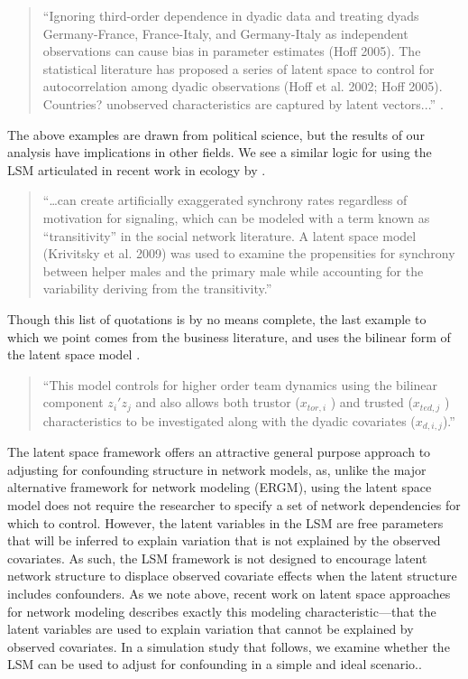 \documentclass[11pt]{article}
\begin{document}
\begin{quote}
``Ignoring third-order dependence in dyadic data and treating dyads
  Germany-France, France-Italy, and Germany-Italy as independent
  observations can cause bias in parameter estimates (Hoff 2005). The
  statistical literature has proposed a series of latent space to
  control for autocorrelation among dyadic observations (Hoff et
  al. 2002; Hoff 2005). Countries? unobserved characteristics are
  captured by latent vectors...'' \citep[p. 17]{cao2016transnational}.
\end{quote}

The above examples are drawn from political science, but the results
of our analysis have implications in other fields. We see a similar
logic for using the LSM articulated in recent work in ecology by
\citet[p. 989]{nomano2015unrelated}.

\begin{quote}
``\ldots can create artificially exaggerated synchrony rates
  regardless of motivation for signaling, which can be modeled with a
  term known as ``transitivity'' in the social network literature. A
  latent space model (Krivitsky et al. 2009) was used to examine the
  propensities for synchrony between helper males and the primary male
  while accounting for the variability deriving from the
  transitivity.''
\end{quote}

Though this list of quotations is by no means complete, the last
example to which we point comes from the business literature, and uses
the bilinear form of the latent space model
\citep[p. 7]{dass2011impact}.

\begin{quote}
``This model controls for higher order team dynamics using the
  bilinear component $z_i'z_j$ and also allows both trustor
  ($x_{tor,i}$ ) and trusted ($x_{ted,j}$ ) characteristics to be
  investigated along with the dyadic covariates ($x_{d,i,j}$).''
\end{quote}

The latent space framework offers an attractive general purpose
approach to adjusting for confounding structure in network models, as,
unlike the major alternative framework for network modeling (ERGM),
using the latent space model does not require the researcher to
specify a set of network dependencies for which to control.  However,
the latent variables in the LSM are free parameters that will be
inferred to explain variation that is not explained by the observed
covariates. As such, the LSM framework is not designed to encourage
latent network structure to displace observed covariate effects when
the latent structure includes confounders. As we note above, recent
work on latent space approaches for network modeling describes exactly
this modeling characteristic---that the latent variables are used to
explain variation that cannot be explained by observed covariates. In
a simulation study that follows, we examine whether the LSM can be
used to adjust for confounding in a simple and ideal scenario..
\end{document}
